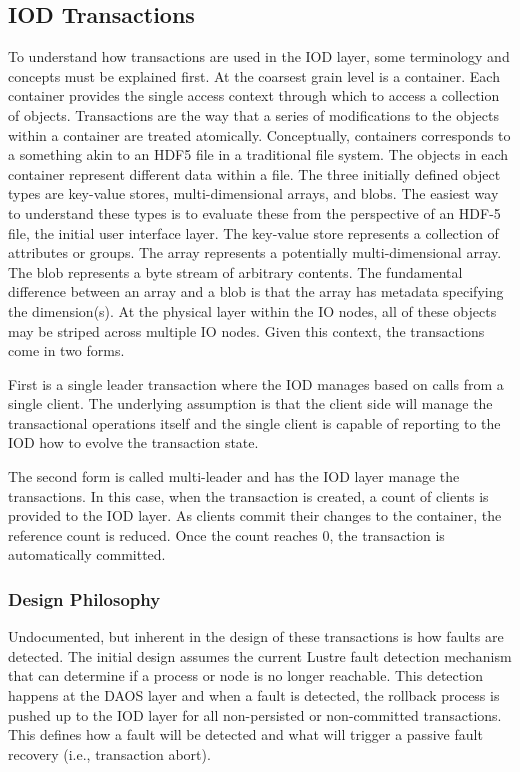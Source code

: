 \documentclass[conference]{IEEEtran}
\begin{document}
\subsection{IOD Transactions}
To understand how transactions are used in the IOD layer, some terminology and
concepts must be explained first. At the coarsest grain level is a container.
Each container provides the single access context through which to access a
collection of objects. Transactions are the way that a series of modifications
to the objects within a container are treated atomically. Conceptually,
containers corresponds to a something akin to an HDF5 file in a traditional
file system. The objects in each container represent different data within a
file.  The three initially defined object types are key-value stores,
multi-dimensional arrays, and blobs.  The easiest way to understand these types
is to evaluate these from the perspective of an HDF-5 file, the initial user
interface layer. The key-value store represents a collection of attributes or
groups. The array represents a potentially multi-dimensional array.  The blob
represents a byte stream of arbitrary contents.  The fundamental difference
between an array and a blob is that the array has metadata specifying the
dimension(s). At the physical layer within the IO nodes, all of these objects
may be striped across multiple IO nodes.  Given this context, the transactions
come in two forms.

First is a single leader transaction where the IOD manages based on calls from
a single client. The underlying assumption is that the client side will manage
the transactional operations itself and the single client is capable of
reporting to the IOD how to evolve the transaction state. 

The second form is called multi-leader and has the IOD layer manage the
transactions. In this case, when the transaction is created, a count of clients
is provided to the IOD layer. As clients commit their changes to the container,
the reference count is reduced. Once the count reaches 0, the transaction is
automatically committed.

\subsubsection{Design Philosophy}
Undocumented, but inherent in the design of these transactions is how faults
are detected. The initial design assumes the current Lustre fault detection
mechanism that can determine if a process or node is no longer reachable. This
detection happens at the DAOS layer and when a fault is detected, the rollback
process is pushed up to the IOD layer for all non-persisted or non-committed
transactions. This defines how a fault will be detected and what will trigger a
passive fault recovery (i.e., transaction abort).
\end{document}
